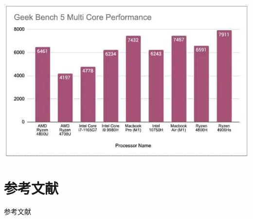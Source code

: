 \documentclass[a4paper]{article}
\begin{document}
\includegraphics[width=\textwidth]{Geekbench5-Multicore.png}

\section{参考文献}
参考文献\cite{quinn1994parallel}\cite{golub2014scientific}\cite{joseph2022parallel}

\newpage


\end{document}
